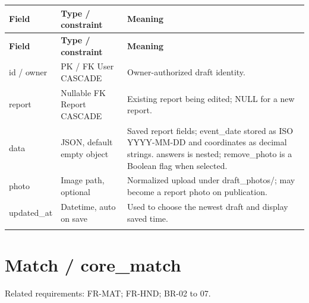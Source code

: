\documentclass[12pt,a4paper,oneside]{report}
\begin{document}
\begin{longtable}{@{}P{0.24\dimexpr\textwidth-24pt\relax}P{0.28\dimexpr\textwidth-24pt\relax}P{0.48\dimexpr\textwidth-24pt\relax}@{}}

\toprule \textbf{Field} & \textbf{Type / constraint} & \textbf{Meaning} \\ \midrule\endfirsthead

\toprule \textbf{Field} & \textbf{Type / constraint} & \textbf{Meaning} \\ \midrule\endhead

\bottomrule\endfoot

id / owner & PK / FK User CASCADE & Owner-authorized draft identity. \\ \addlinespace[3pt]

report & Nullable FK Report CASCADE & Existing report being edited; NULL for a new report. \\ \addlinespace[3pt]

data & JSON, default empty object & Saved report fields; event\_date stored as ISO YYYY-MM-DD and coordinates as decimal strings. answers is nested; remove\_photo is a Boolean flag when selected. \\ \addlinespace[3pt]

photo & Image path, optional & Normalized upload under draft\_photos/; may become a report photo on publication. \\ \addlinespace[3pt]

updated\_at & Datetime, auto on save & Used to choose the newest draft and display saved time. \\ \addlinespace[3pt]

\end{longtable}


\section{Match / core\_match}

Related requirements: FR-MAT; FR-HND; BR-02 to 07.
\end{document}
